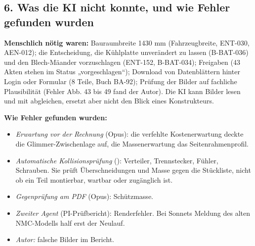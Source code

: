 \documentclass[10pt,a4paper]{article}
\begin{document}
\subsection*{6. Was die KI nicht konnte, und wie Fehler gefunden wurden}
\textbf{Menschlich nötig waren:} Bauraumbreite 1430 mm (Fahrzeugbreite, ENT-030, AEN-012); die Entscheidung, die Kühlplatte unverändert zu lassen (B-BAT-036) und den Blech-Mäander vorzuschlagen (ENT-152, B-BAT-034); Freigaben (43 Akten stehen im Status „vorgeschlagen“); Download von Datenblättern hinter Login oder Formular (8 Teile, Buch BA-92); Prüfung der Bilder auf fachliche Plausibilität (Fehler Abb. 43 bis 49 fand der Autor). Die KI kann Bilder lesen und mit  abgleichen, ersetzt aber nicht den Blick eines Konstrukteurs.\par
\textbf{Wie Fehler gefunden wurden:}
\begin{itemize}[nosep]
\item \emph{Erwartung vor der Rechnung} (Opus): die verfehlte Kostenerwartung deckte die Glimmer-Zwischenlage auf, die Massenerwartung das Seitenrahmenprofil.
\item \emph{Automatische Kollisionsprüfung} (): Verteiler, Trennstecker, Fühler, Schrauben. Sie prüft Überschneidungen und Masse gegen die Stückliste, nicht ob ein Teil montierbar, wartbar oder zugänglich ist.
\item \emph{Gegenprüfung am PDF} (Opus): Schützmasse.
\item \emph{Zweiter Agent} (PI-Prüfbericht): Renderfehler. Bei Sonnets Meldung des alten NMC-Modells half erst der Neulauf.
\item \emph{Autor:} falsche Bilder im Bericht.
\end{itemize}
\end{document}

